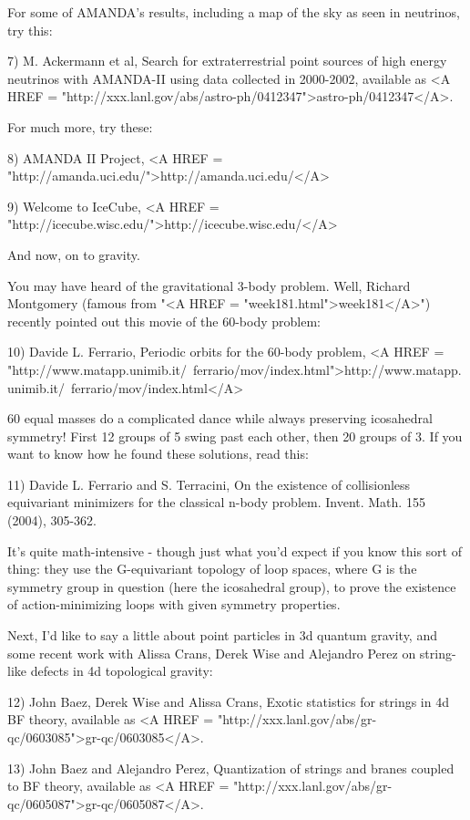 For some of AMANDA's results, including a map of the sky as
seen in neutrinos, try this:

7) M. Ackermann et al, Search for extraterrestrial point sources of
high energy neutrinos with AMANDA-II using data collected in 2000-2002,
available as <A HREF = "http://xxx.lanl.gov/abs/astro-ph/0412347">astro-ph/0412347</A>.

For much more, try these:

8) AMANDA II Project, <A HREF = "http://amanda.uci.edu/">http://amanda.uci.edu/</A>

9) Welcome to IceCube, <A HREF = "http://icecube.wisc.edu/">http://icecube.wisc.edu/</A>

And now, on to gravity.  

You may have heard of the gravitational 3-body problem.  Well, 
Richard Montgomery (famous from "<A HREF = "week181.html">week181</A>") recently pointed out 
this movie of the 60-body problem:

10) Davide L. Ferrario, Periodic orbits for the 60-body problem,
<A HREF = "http://www.matapp.unimib.it/~ferrario/mov/index.html">http://www.matapp.unimib.it/~ferrario/mov/index.html</A>

60 equal masses do a complicated dance while always preserving 
icosahedral symmetry!  First 12 groups of 5 swing past each other, 
then 20 groups of 3.  If you want to know how he found these solutions, 
read this:

11) Davide L. Ferrario and S. Terracini, On the existence of collisionless 
equivariant minimizers for the classical n-body problem.  Invent. Math.
155 (2004), 305-362.

It's quite math-intensive - though just what you'd expect if you 
know this sort of thing: they use the G-equivariant topology of loop 
spaces, where G is the symmetry group in question (here the icosahedral 
group), to prove the existence of action-minimizing loops with given 
symmetry properties.

Next, I'd like to say a little about point particles in 3d quantum 
gravity, and some recent work with Alissa Crans, Derek Wise and Alejandro 
Perez on string-like defects in 4d topological gravity:

12) John Baez, Derek Wise and Alissa Crans, Exotic statistics for strings
in 4d BF theory, available as <A HREF = "http://xxx.lanl.gov/abs/gr-qc/0603085">gr-qc/0603085</A>.

13) John Baez and Alejandro Perez, Quantization of strings and branes 
coupled to BF theory, available as <A HREF = "http://xxx.lanl.gov/abs/gr-qc/0605087">gr-qc/0605087</A>.

